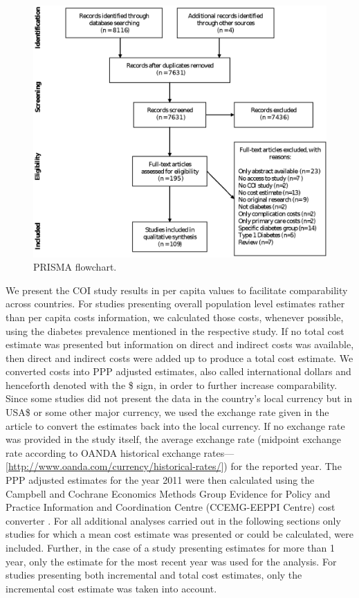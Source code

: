 \begin{figure}[p]
\caption{\label{fig:review_prisma_flowchart}\acs*{PRISMA} flowchart.}%
\centering
\includegraphics[width=0.9\linewidth]{Review/Figures/Fig1.eps}
\end{figure}

We present the \ac{COI} study results in per capita values to facilitate comparability across countries. For studies presenting overall population level estimates rather than per capita costs information, we calculated those costs, whenever possible, using the diabetes prevalence mentioned in the respective study. If no total cost estimate was presented but information on direct and indirect costs was available, then direct and indirect costs were added up to produce a total cost estimate. We converted costs into \ac{PPP} adjusted estimates, also called international dollars and henceforth denoted with the \$ sign, in order to further increase comparability. Since some studies did not present the data in the country's local currency but in USA\$ or some other major currency, we used the exchange rate given in the article to convert the estimates back into the local currency. If no exchange rate was provided in the study itself, the average exchange rate (midpoint exchange rate according to OANDA historical exchange rates---[\url{http://www.oanda.com/currency/historical-rates/}]) for the reported year. The \ac{PPP} adjusted estimates for the year 2011 were then calculated using the Campbell and Cochrane Economics Methods Group Evidence for Policy and Practice Information and Coordination Centre (CCEMG-EEPPI Centre) cost converter \parencite{Shemilt2010}. For all additional analyses carried out in the following sections only studies for which a mean cost estimate was presented or could be calculated, were included. Further, in the case of a study presenting estimates for more than 1 year, only the estimate for the most recent year was used for the analysis. For studies presenting both incremental and total cost estimates, only the incremental cost estimate was taken into account.

